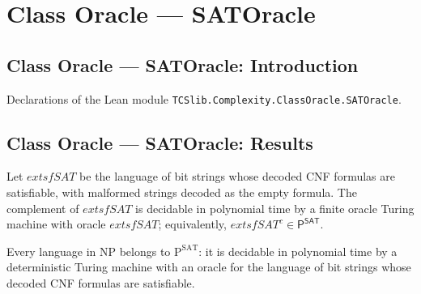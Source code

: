 \section{Class Oracle --- SATOracle}
\subsection*{Class Oracle --- SATOracle: Introduction}

Declarations of the Lean module \texttt{TCSlib.Complexity.ClassOracle.SATOracle}.

\subsection*{Class Oracle --- SATOracle: Results}

\begin{theorem}
\label{Complexity.compl_SAT_mem_POracle_SAT}
\leanok
{}
Let $	extsf{SAT}$ be the language of bit strings whose decoded CNF formulas are
satisfiable, with malformed strings decoded as the empty formula. The complement of
$	extsf{SAT}$ is decidable in polynomial time by a finite oracle Turing machine with
oracle $	extsf{SAT}$; equivalently, $	extsf{SAT}^{c} \in \mathsf{P}^{\textsf{SAT}}$.
\end{theorem}

\begin{theorem}
\label{Complexity.NP_subset_POracle_SAT}
\leanok
{}
Every language in $\mathrm{NP}$ belongs to $\mathrm{P}^{\mathrm{SAT}}$: it is decidable
in polynomial time by a deterministic Turing machine with an oracle for the language of
bit strings whose decoded CNF formulas are satisfiable.
\end{theorem}

